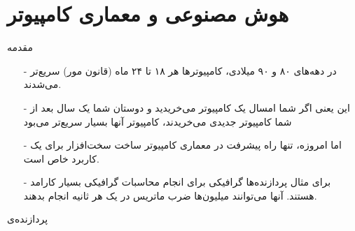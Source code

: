 \section{هوش مصنوعی و معماری کامپیوتر}
\begin{frame}{مقدمه}
\begin{itemize}\itemr
\item[-]
در دهه‌های ۸۰ و ۹۰ میلادی، کامپیوتر‌‌ها هر ۱۸ تا ۲۴ ماه (قانون مور) سریع‌تر می‌شدند.
\item[-]
این یعنی اگر شما امسال یک کامپیوتر می‌خریدید و دوستان شما یک سال بعد از شما کامپیوتر جدیدی می‌خریدند، کامپیوتر‌ آنها بسیار سریع‌تر می‌بود
\item[-]
اما امروزه، تنها راه پیشرفت در معماری کامپیوتر ساخت سخت‌افزار برای یک کاربرد خاص است.
\item[-]
برای مثال پردازند‌ه‌ها گرافیکی
برای انجام محاسبات گرافیکی بسیار کارامد هستند. آنها می‌توانند میلیون‌ها ضرب ماتریس در یک هر ثانیه انجام بدهند.
\end{itemize}
\end{frame}

\begin{frame}{پردازنده‌ی }
\end{frame}